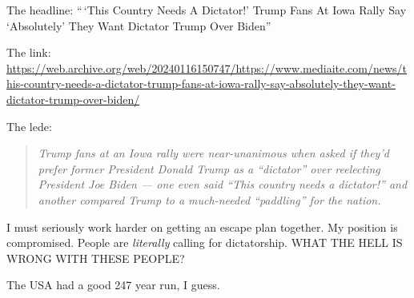 The headline: ``\,`This Country Needs A Dictator!' Trump Fans At Iowa
Rally Say `Absolutely' They Want Dictator Trump Over Biden''

The link:
\url{https://web.archive.org/web/20240116150747/https://www.mediaite.com/news/this-country-needs-a-dictator-trump-fans-at-iowa-rally-say-absolutely-they-want-dictator-trump-over-biden/}

The lede:

\begin{quote}
\emph{Trump fans at an Iowa rally were near-unanimous when asked if
they'd prefer former President Donald Trump as a ``dictator'' over
reelecting President Joe Biden --- one even said ``This country needs a
dictator!'' and another compared Trump to a much-needed ``paddling'' for
the nation.}
\end{quote}

I must seriously work harder on getting an escape plan together. My
position is compromised. People are \emph{literally} calling for
dictatorship. WHAT THE HELL IS WRONG WITH THESE PEOPLE?

The USA had a good 247 year run, I guess.

